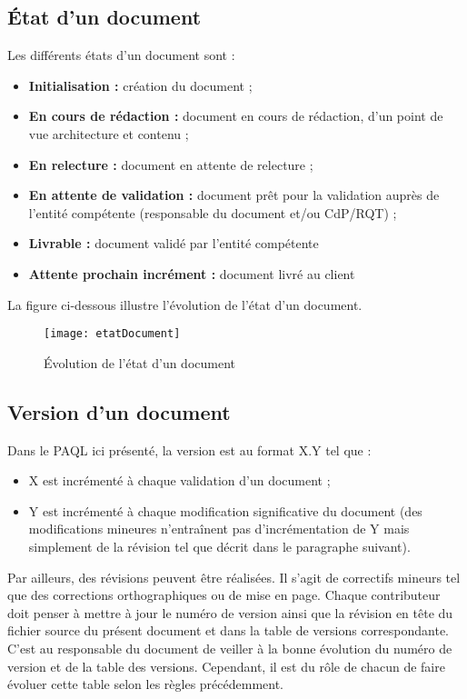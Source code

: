 \documentclass[a4paper,11pt,titlepage]{article}
\begin{document}
\subsection{État d'un document}
Les différents états d'un document sont :
\begin{itemize}
    \item \textbf{Initialisation :} création du document ;
    \item \textbf{En cours de rédaction :} document en cours de rédaction, d'un point de vue architecture et contenu ;
    \item \textbf{En relecture :} document en attente de relecture ;
    \item \textbf{En attente de validation :} document prêt pour la validation auprès de l'entité compétente (responsable du document et/ou CdP/RQT) ;
    \item \textbf{Livrable :} document validé par l'entité compétente
    \item \textbf{Attente prochain incrément :} document livré au client
\end{itemize}
La figure ci-dessous illustre l'évolution de l'état d'un document.
\begin{figure}[H]
    \centering
    \texttt{[image: etatDocument]}
    \caption{Évolution de l'état d'un document}
\end{figure}

\subsection{Version d'un document}
Dans le PAQL ici présenté, la version est au format X.Y tel que :
\begin{itemize}
    \item X est incrémenté à chaque validation d'un document ;
    \item Y est incrémenté à chaque modification significative du
          document (des modifications mineures n'entraînent pas d'incrémentation de Y
          mais simplement de la révision tel que décrit dans le paragraphe suivant).
\end{itemize}

Par ailleurs, des révisions peuvent être réalisées. Il s'agit de correctifs mineurs tel que des corrections orthographiques ou de mise en page.
Chaque contributeur doit penser à mettre à jour le numéro de version ainsi que la révision en tête du fichier source du présent document et 
dans la table de versions correspondante. C'est au responsable du document de veiller à la bonne évolution du numéro de version et de la table des versions. Cependant, il est du rôle de chacun de faire évoluer cette table selon les règles précédemment.\\
\end{document}
